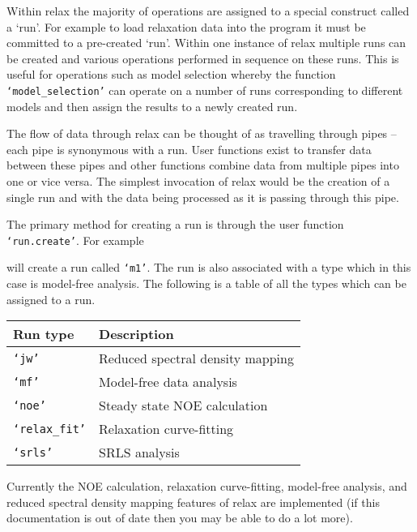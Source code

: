 Within relax the majority of operations are assigned to a special construct called a `run'.  For example to load relaxation data into the program it must be committed to a pre-created `run'.  Within one instance of relax multiple runs can be created and various operations performed in sequence on these runs.  This is useful for operations such as model selection whereby the function \texttt{`model\_selection'} can operate on a number of runs corresponding to different models and then assign the results to a newly created run.

The flow of data through relax can be thought of as travelling through pipes -- each pipe is synonymous with a run.  User functions exist to transfer data between these pipes and other functions combine data from multiple pipes into one or vice versa.  The simplest invocation of relax would be the creation of a single run and with the data being processed as it is passing through this pipe.

The primary method for creating a run is through the user function \texttt{`run.create'}.  For example


will create a run called \texttt{`m1'}.  The run is also associated with a type which in this case is model-free analysis.  The following is a table of all the types which can be assigned to a run.

\begin{center}
\begin{tabular}{ll}
\toprule

Run type                & Description \\

\midrule

\texttt{`jw'}           & Reduced spectral density mapping \\
\texttt{`mf'}           & Model-free data analysis \\
\texttt{`noe'}          & Steady state NOE calculation \\
\texttt{`relax\_fit'}   & Relaxation curve-fitting \\
\texttt{`srls'}         & SRLS analysis \\

\bottomrule
\end{tabular}
\end{center}

Currently the NOE calculation, relaxation curve-fitting, model-free analysis, and reduced spectral density mapping features of relax are implemented (if this documentation is out of date then you may be able to do a lot more).



